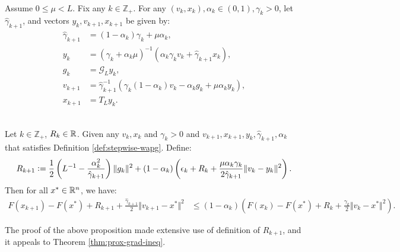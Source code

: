 \documentclass[12pt]{article}
\begin{document}
        \begin{definition}\;\label{def:stepwise-wapg}\\
            Assume $0 \le \mu < L$.
            Fix any $k \in \mathbb Z_+$. 
            For any $(v_k, x_k), \alpha_k \in (0, 1), \gamma_k > 0$, let $\hat \gamma_{k + 1}$, and vectors $y_k, v_{k + 1}, x_{k + 1}$ be given by: 
            \begin{align}
                \hat \gamma_{k + 1} &= (1 - \alpha_k)\gamma_k + \mu \alpha_k, \label{eqn:stepwise-wapg-eqn1}
                \\
                y_k &= 
                (\gamma_k + \alpha_k \mu)^{-1}(\alpha_k \gamma_k v_k + \hat\gamma_{k + 1} x_k), \label{eqn:stepwise-wapg-eqn2}
                \\
                g_k &= \mathcal G_L y_k, \label{eqn:stepwise-wapg-eqn3}
                \\
                v_{k + 1} &= \hat\gamma^{-1}_{k + 1}
                (\gamma_k(1 - \alpha_k) v_k - \alpha_k g_k + \mu \alpha_k y_k), \label{eqn:stepwise-wapg-eqn4}
                \\
                x_{k + 1} &= T_L y_k. \label{eqn:stepwise-wapg-eqn5}
            \end{align}
        \end{definition}
        \begin{proposition}\;\label{prop:stepwise-lyapunov} \\
            Let $k \in \mathbb Z_+$, $R_k \in \mathbb R$. 
            Given any $v_k, x_k$ and $\gamma_k > 0$ and $v_{k + 1}, x_{k + 1}, y_k, \hat \gamma_{k + 1}, \alpha_k$ that satisfies Definition \ref{def:stepwise-wapg}. 
            Define: 
            \begin{align}\label{eqn:stepwise-lya-1}
                R_{k + 1}
                \vcentcolon=
                \frac{1}{2}\left(
                    L^{-1} - \frac{\alpha_k^2}{\hat \gamma_{k + 1}}
                \right)\Vert g_k\Vert^2
                + 
                (1 - \alpha_k)
                \left(
                    \epsilon_k + R_k + 
                    \frac{\mu\alpha_k\gamma_k}{2\hat \gamma_{k + 1}}
                    \Vert v_k - y_k\Vert^2
                \right). 
            \end{align}
            Then for all $x^* \in \mathbb R^n$, we have:
            {\small
            \begin{align}\label{ineq:stepwise-lya-2}
                F(x_{k + 1}) - F(x^*) + R_{k + 1} + \frac{\hat \gamma_{k + 1}}{2}\Vert v_{k + 1} - x^*\Vert^2
                &\le 
                (1 - \alpha_k)
                \left(
                    F(x_k) - F(x^*) + R_k + \frac{\gamma_{k}}{2}\Vert v_k - x^*\Vert^2
                \right). 
            \end{align}
            }
        \end{proposition}
        The proof of the above proposition made extensive use of definition of $R_{k + 1}$, and it appeals to Theorem \ref{thm:prox-grad-ineq}. 
        
\end{document}
